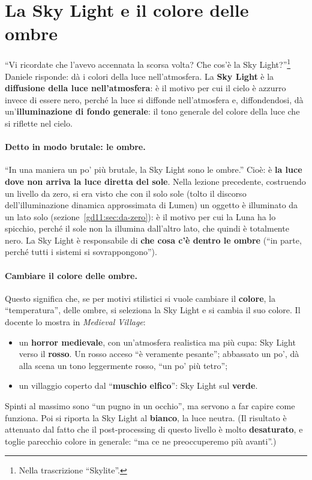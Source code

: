 \section{La Sky Light e il colore delle ombre}
\label{gd14:sec:skylight}



``Vi ricordate che l'avevo accennata la scorsa volta? Che cos'è la Sky
Light?''\footnote{Nella trascrizione ``Skylite''.} Daniele risponde: dà i colori
della luce nell'atmosfera. La \textbf{Sky Light} è la \textbf{diffusione della luce
nell'atmosfera}: è il motivo per cui il cielo è azzurro invece di essere nero,
perché la luce si diffonde nell'atmosfera e, diffondendosi, dà
un'\textbf{illuminazione di fondo generale}: il tono generale del colore della luce
che si riflette nel cielo.

\paragraph{Detto in modo brutale: le ombre.} ``In una maniera un po' più brutale, la
Sky Light sono le ombre.'' Cioè: è \textbf{la luce dove non arriva la luce diretta del
sole}. Nella lezione precedente, costruendo un livello da zero, si era visto che
con il solo sole (tolto il discorso dell'illuminazione dinamica approssimata di
Lumen) un oggetto è illuminato da un lato solo
(sezione~\ref{gd11:sec:da-zero}): è il motivo per cui la Luna ha lo spicchio, perché
il sole non la illumina dall'altro lato, che quindi è totalmente nero. La Sky
Light è responsabile di \textbf{che cosa c'è dentro le ombre} (``in parte, perché
tutti i sistemi si sovrappongono'').

\paragraph{Cambiare il colore delle ombre.} Questo significa che, se per motivi
stilistici si vuole cambiare il \textbf{colore}, la ``temperatura'', delle ombre, si
seleziona la Sky Light e si cambia il suo colore. Il docente lo mostra in
\emph{Medieval Village}:
\begin{itemize}
  \item un \textbf{horror medievale}, con un'atmosfera realistica ma più cupa: Sky
        Light verso il \textbf{rosso}. Un rosso acceso ``è veramente pesante'';
        abbassato un po', dà alla scena un tono leggermente rosso, ``un po' più
        tetro'';
  \item un villaggio coperto dal ``\textbf{muschio elfico}'': Sky Light sul
        \textbf{verde}.
\end{itemize}
Spinti al massimo sono ``un pugno in un occhio'', ma servono a far capire come
funziona. Poi si riporta la Sky Light al \textbf{bianco}, la luce neutra. (Il
risultato è attenuato dal fatto che il post-processing di questo livello è molto
\textbf{desaturato}, e toglie parecchio colore in generale: ``ma ce ne
preoccuperemo più avanti''.)

